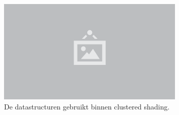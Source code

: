 \begin{figure}
  \centering
  \includegraphics[width=0.8\textwidth]{./img/raw/placeholder.png}
  \caption{De datastructuren gebruikt binnen clustered shading.}
  \label{fig:cs-datastructuren}
\end{figure}
